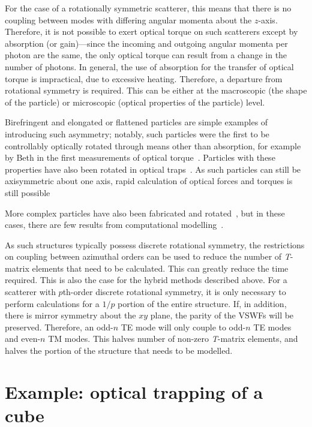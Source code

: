 \documentclass{article}
\begin{document}
For the case of a rotationally symmetric scatterer, this means that there
is no coupling between modes with differing angular momenta about
the $z$-axis\cite{waterman1971,mishchenko1991,nieminen2004a}.
Therefore, it is not possible to exert optical torque on such scatterers
except by absorption (or gain)---since the incoming and outgoing
angular momenta
per photon are the same, the only optical torque can result from a change
in the number of photons. In general, the use of absorption for the
transfer of optical torque is impractical, due to excessive heating.
Therefore, a departure from rotational symmetry is required. This
can be either at the macroscopic (the shape of the particle) or
microscopic (optical properties of the particle) level.

Birefringent and elongated or flattened particles are simple
examples of introducing such asymmetry; notably, such particles were
the first to be controllably optically rotated through means other
than absorption, for example by Beth in the first measurements
of optical torque~\cite{beth1936}. Particles with these properties
have also been rotated in optical traps~\cite{friese1998nature,bonin2002,bayoudh2003,bishop2003}. As such particles can still
be axisymmetric about one axis, rapid calculation of optical
forces and torques is still possible~\cite{bayoudh2003,bishop2003}

More complex particles have also been fabricated and
rotated~\cite{galajda2001,luo2000,ukita2002}, but in these cases,
there are few results from computational modelling~\cite{collett2003}.

As such structures typically possess discrete rotational symmetry,
the restrictions on coupling between azimuthal orders can be used
to reduce the number of \textit{T}-matrix elements that need to
be calculated. This can greatly reduce the time required. This
is also the case for the hybrid methods described above. For a scatterer
with $p$th-order discrete rotational symmetry, it is only necessary
to perform calculations for a $1/p$ portion of the entire structure.
If, in addition, there is mirror symmetry about the $xy$ plane, the
parity of the VSWFs will be preserved. Therefore, an odd-$n$ TE mode
will only couple to odd-$n$ TE modes and even-$n$ TM modes. This halves
number of non-zero \textit{T}-matrix elements, and halves the portion
of the structure that needs to be modelled.

\section{Example: optical trapping of a cube}
\end{document}
